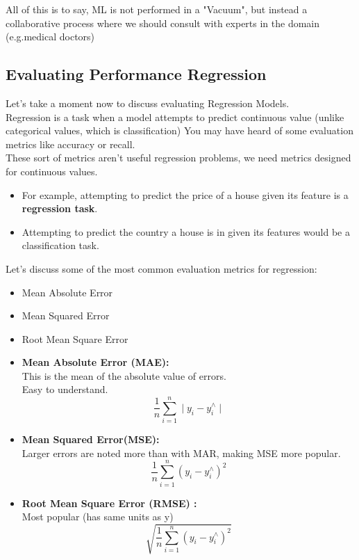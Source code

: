 \documentclass[12pt]{article}
\begin{document}
\LARGE
All of this is to say, ML is not performed in a "Vacuum", but instead a collaborative process where we should consult with experts in the domain (e.g.medical doctors)
\small

\subsection{Evaluating Performance Regression}
Let's take a moment now to discuss evaluating Regression Models.\\
	Regression is a task when a model attempts to predict continuous value (unlike categorical values, which is classification)
	You may have heard of some evaluation metrics like accuracy or recall.\\
	These sort of metrics aren't useful regression problems, we need metrics designed for continuous values.
 
 \begin{itemize}
 	\item
 	For example, attempting to predict the price of a house given its feature is a \textbf{regression task}.
 	\item
 	Attempting to predict the country a house is in given its features would be a classification task.
 \end{itemize}
 
 Let's discuss some of the most common evaluation metrics for regression:
 \begin{itemize}
 	\item
 	Mean Absolute Error
 	\item
 	Mean Squared Error
 	\item
 	Root Mean Square Error
 \end{itemize}
 
 
  \begin{itemize}
 	\item
 	\textbf{Mean Absolute Error (MAE):}\\
 	This is the mean of the absolute value of errors.\\
 	Easy to understand.
	\begin{equation}
		\frac{1}{n} \sum_{i=1}^{n} \mid y_{i}- y^{\wedge}_{i}\mid
	\end{equation}	 	

 	\item
 	\textbf{Mean Squared Error(MSE):}\\
 		Larger errors are noted more than with MAR, making MSE more popular.
		\begin{equation}
		 	\frac{1}{n} \sum_{i=1}^{n} (y_{i}- y^{\wedge}_{i})^{2}
		\end{equation}
 	\item
 	\textbf{Root Mean Square Error (RMSE) :}\\
 	Most popular (has same units as y)
 	\begin{equation}
	\sqrt{\frac{1}{n} \sum_{i=1}^{n} (y_{i}- y^{\wedge}_{i})^{2}}
 	\end{equation}
 \end{itemize}
 
\end{document}
